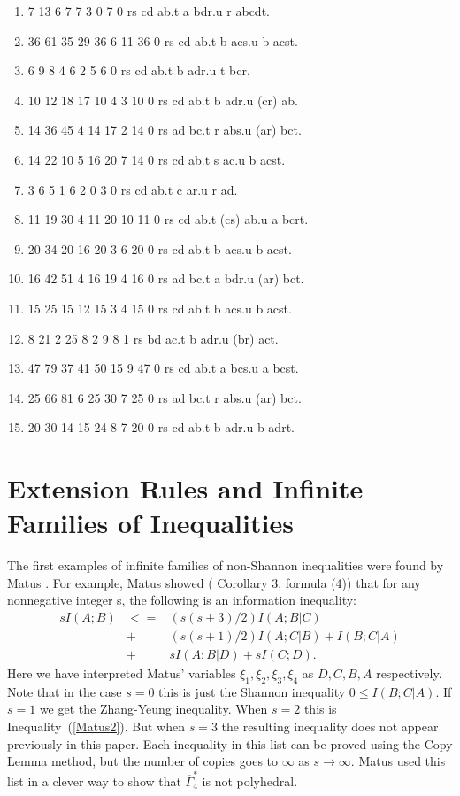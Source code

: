 \documentclass[10pt,journal]{IEEEtran}
\begin{document}
\begin{enumerate}
\item 7 13 6 7 7 3 0 7 0 rs cd ab.t a bdr.u r abcdt.
\item 36 61 35 29 36 6 11 36 0 rs cd ab.t b acs.u b acst.
\item 6 9 8 4 6 2 5 6 0 rs cd ab.t b adr.u t bcr.
\item 10 12 18 17 10 4 3 10 0 rs cd ab.t b adr.u (cr) ab.
\item 14 36 45 4 14 17 2 14 0 rs ad bc.t r abs.u (ar) bct.
\item 14 22 10 5 16 20 7 14 0 rs cd ab.t s ac.u b acst.
\item 3 6 5 1 6 2 0 3 0 rs cd ab.t c ar.u r ad.
\item 11 19 30 4 11 20 10 11 0 rs cd ab.t (cs) ab.u a bcrt.
\item 20 34 20 16 20 3 6 20 0 rs cd ab.t b acs.u b acst.
\item 16 42 51 4 16 19 4 16 0 rs ad bc.t a bdr.u (ar) bct.
\item 15 25 15 12 15 3 4 15 0 rs cd ab.t b acs.u b acst.
\item 8 21 2 25 8 2 9 8 1 rs bd ac.t b adr.u (br) act.
\item 47 79 37 41 50 15 9 47 0 rs cd ab.t a bcs.u a bcst.
\item 25 66 81 6 25 30 7 25 0 rs ad bc.t r abs.u (ar) bct.
\item 20 30 14 15 24 8 7 20 0 rs cd ab.t b adr.u b adrt.
\end{enumerate}



\section{Extension Rules and Infinite Families of Inequalities}\label{infinite}

The first examples of infinite families of non-Shannon inequalities
were found by Matus \cite{Matus}.  For example, Matus showed (\cite{Matus} Corollary 3, formula (4))
that for any nonnegative integer s, the following is an
information inequality:
\begin{eqnarray} \label{Matus}
sI(A;B)&<=&(s(s+3)/2)I(A;B|C)\\
\nonumber &+&(s(s+1)/2)I(A;C|B)+I(B;C|A)\\
\nonumber &+&sI(A;B|D)+sI(C;D).
\end{eqnarray}
Here we have interpreted Matus' variables $\xi_1,\xi_2,\xi_3,\xi_4$ as $D,C,B,A$ respectively.
Note that in the case $s=0$ this is just the Shannon inequality $0 \leq I(B;C|A)$.
If $s=1$ we get the Zhang-Yeung inequality. When $s=2$ this is Inequality~(\ref{Matus2}).
But when $s=3$ the resulting inequality does not appear previously in this paper.
Each inequality in this list can be proved using the Copy Lemma method,
but the number of copies goes to $\infty$ as $s\to \infty$.
Matus used this list in a clever way to show that $\overline{\Gamma}^*_4$ is not polyhedral.
\end{document}
